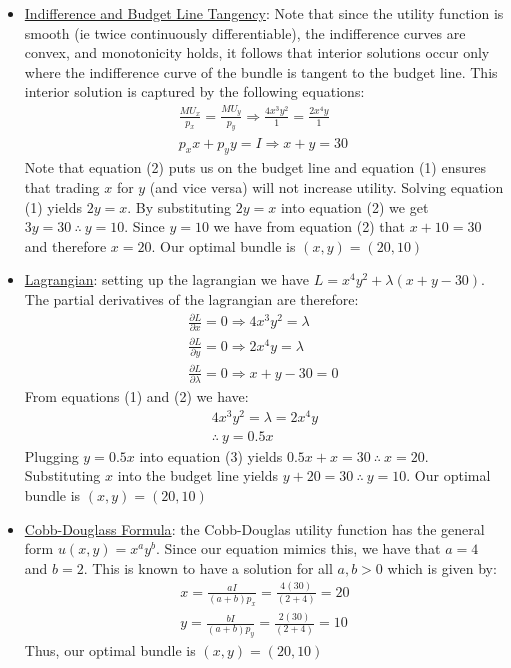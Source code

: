 \documentclass{article}
\begin{document}
  \begin{itemize}
    \item  \underline{Indifference and Budget Line Tangency}: Note that since the utility function is smooth (ie twice continuously differentiable), the indifference curves are convex, and monotonicity holds, it follows that interior solutions occur only where the indifference curve of the bundle is tangent to the budget line. This interior solution is captured by the following equations:
    \begin{gather*}
      \frac{MU_{x}}{p_{x}} = \frac{MU_{y}}{p_{y}} \Rightarrow \frac{4x^{3}y^{2}}{1} = \frac{2x^{4}y}{1} \ \tag{1} \\
      p_{x}x + p_{y}y = I \Rightarrow x + y = 30 \ \tag{2}
    \end{gather*}
    Note that equation (2) puts us on the budget line and equation (1) ensures that trading $x$ for $y$ (and vice versa) will not increase utility. Solving equation (1) yields $2y = x$. By substituting $2y = x$ into equation (2) we get $3y = 30 \ \therefore \ y = 10$. Since $y=10$ we have from equation (2) that $x + 10 = 30$ and therefore $x = 20$. Our optimal bundle is $(x,y) = (20, 10)$
    \item  \underline{Lagrangian}: setting up the lagrangian we have $L = x^{4}y^{2} + \lambda (x + y - 30)$. The partial derivatives of the lagrangian are therefore:
    \begin{gather*}
      \frac{\partial L}{\partial x} = 0 \Rightarrow 4x^{3}y^{2} = \lambda \ \tag{1} \\
      \frac{\partial L}{\partial y} = 0 \Rightarrow 2x^{4}y = \lambda \ \tag{2} \\
      \frac{\partial L}{\partial \lambda} = 0 \Rightarrow x + y - 30 = 0 \ \tag{3}
    \end{gather*}
    From equations (1) and (2) we have:
    \begin{gather*}
      4x^{3}y^{2} = \lambda = 2x^{4}y \\
      \therefore \ y = 0.5x
    \end{gather*}
    Plugging $y = 0.5x$ into equation (3) yields $0.5x + x = 30 \ \therefore \ x = 20$. Substituting $x$ into the budget line yields $y + 20 = 30 \ \therefore \ y = 10$. Our optimal bundle is $(x,y) = (20, 10)$
    \item  \underline{Cobb-Douglass Formula}: the Cobb-Douglas utility function has the general form $u(x,y) = x^{a}y^{b}$. Since our equation mimics this, we have that $a=4$ and $b=2$. This is known to have a solution for all $a,b > 0$ which is given by:
    \begin{gather*}
      x = \frac{aI}{(a+b)p_{x}} = \frac{4(30)}{(2+4)} = 20 \\
      y = \frac{bI}{(a+b)p_{y}} = \frac{2(30)}{(2+4)} = 10
    \end{gather*}
    Thus, our optimal bundle is $(x,y) = (20, 10)$
  \end{itemize}
  \par
\vspace{6mm}
\end{document}
